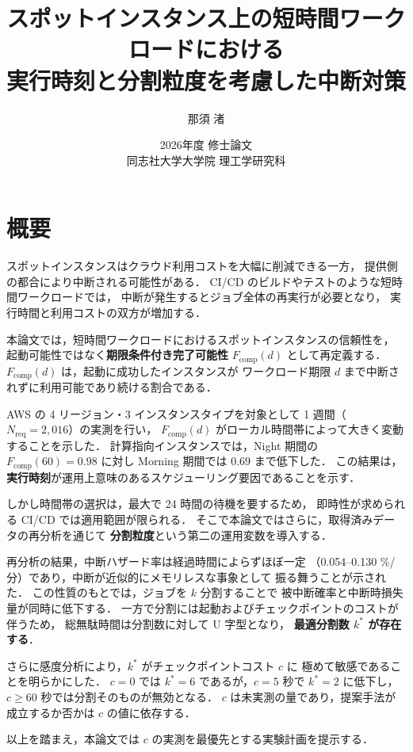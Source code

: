 \documentclass[11pt,a4paper]{ltjsreport}
\title{\vspace{-10mm}
スポットインスタンス上の短時間ワークロードにおける\\
実行時刻と分割粒度を考慮した中断対策}
\author{那須 渚}
\date{2026年度 修士論文\\[2mm] 同志社大学大学院 理工学研究科}
\newcommand{\Fcomp}{F_{\mathrm{comp}}}
\newcommand{\Nreq}{N_{\mathrm{req}}}
\begin{document}
\maketitle

\chapter*{概要}

スポットインスタンスはクラウド利用コストを大幅に削減できる一方，
提供側の都合により中断される可能性がある．
CI/CD のビルドやテストのような短時間ワークロードでは，
中断が発生するとジョブ全体の再実行が必要となり，
実行時間と利用コストの双方が増加する．

本論文では，短時間ワークロードにおけるスポットインスタンスの信頼性を，
起動可能性ではなく\textbf{期限条件付き完了可能性}
$\Fcomp(d)$ として再定義する．
$\Fcomp(d)$ は，起動に成功したインスタンスが
ワークロード期限 $d$ まで中断されずに利用可能であり続ける割合である．

AWS の 4 リージョン・3 インスタンスタイプを対象として
1 週間（$\Nreq = 2{,}016$）の実測を行い，
$\Fcomp(d)$ がローカル時間帯によって大きく変動することを示した．
計算指向インスタンスでは，Night 期間の $\Fcomp(60) = 0.98$ に対し
Morning 期間では $0.69$ まで低下した．
この結果は，\textbf{実行時刻}が運用上意味のあるスケジューリング要因であることを示す．

しかし時間帯の選択は，最大で 24 時間の待機を要するため，
即時性が求められる CI/CD では適用範囲が限られる．
そこで本論文ではさらに，取得済みデータの再分析を通じて
\textbf{分割粒度}という第二の運用変数を導入する．

再分析の結果，中断ハザード率は経過時間によらずほぼ一定
（0.054--0.130 \%/分）であり，中断が近似的にメモリレスな事象として
振る舞うことが示された．
この性質のもとでは，ジョブを $k$ 分割することで
被中断確率と中断時損失量が同時に低下する．
一方で分割には起動およびチェックポイントのコストが伴うため，
総無駄時間は分割数に対して U 字型となり，
\textbf{最適分割数 $k^{*}$ が存在する}．

さらに感度分析により，$k^{*}$ がチェックポイントコスト $c$ に
極めて敏感であることを明らかにした．
$c = 0$ では $k^{*} = 6$ であるが，$c = 5$ 秒で $k^{*} = 2$ に低下し，
$c \geq 60$ 秒では分割そのものが無効となる．
$c$ は未実測の量であり，提案手法が成立するか否かは $c$ の値に依存する．

以上を踏まえ，本論文では $c$ の実測を最優先とする実験計画を提示する．
\end{document}
